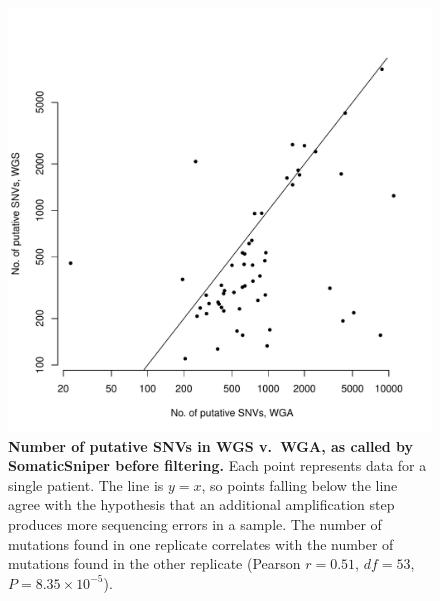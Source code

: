 \documentclass[11pt]{article} %
\begin{document}
\begin{figure}
\centerline{
\includegraphics[width=5in]{C282_v_C484.pdf} }
\caption{\textbf{Number of putative SNVs in WGS v.\ WGA, as called by SomaticSniper before filtering.} Each point represents data for a single patient. The line is $y=x$, so points falling below the line agree with the hypothesis that an additional amplification step produces more sequencing errors in a sample. The number of mutations found in one replicate correlates with the number of mutations found in the other replicate (Pearson $r=0.51$, $df = 53$, $P = 8.35\times 10^{-5}$).}
\label{fig:C282_v_C484}
\end{figure}
\end{document}
